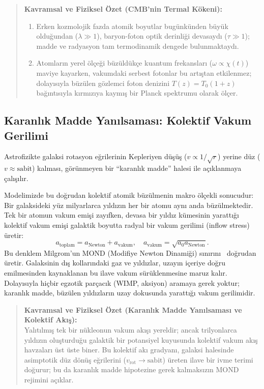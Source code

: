 \begin{quote}
    \small
    \textbf{Kavramsal ve Fiziksel Özet (CMB'nin Termal Kökeni):}
    \begin{enumerate}
        \item Erken kozmolojik fazda atomik boyutlar bugünkünden büyük olduğundan ($\lambda \gg 1$), baryon-foton optik derinliği devasaydı ($\tau \gg 1$); madde ve radyasyon tam termodinamik dengede bulunmaktaydı.
        \item Atomların yerel ölçeği büzüldükçe kuantum frekansları ($\omega \propto \chi(t)$) maviye kayarken, vakumdaki serbest fotonlar bu artıştan etkilenmez; dolayısıyla büzülen gözlemci foton denizini $T(z) = T_0 (1+z)$ bağıntısıyla kırmızıya kaymış bir Planck spektrumu olarak ölçer.
    \end{enumerate}
\end{quote}

\subsection{Karanlık Madde Yanılsaması: Kolektif Vakum Gerilimi}
Astrofizikte galaksi rotasyon eğrilerinin Kepleriyen düşüş ($v \propto 1/\sqrt{r}$) yerine düz ($v \approx \text{sabit}$) kalması, görünmeyen bir ``karanlık madde'' halesi ile açıklanmaya çalışılır.

Modelimizde bu doğrudan kolektif atomik büzülmenin makro ölçekli sonucudur:
Bir galaksideki yüz milyarlarca yıldızın her bir atomu aynı anda büzülmektedir. Tek bir atomun vakum emişi zayıfken, devasa bir yıldız kümesinin yarattığı kolektif vakum emişi galaktik boyutta radyal bir vakum gerilimi (inflow stress) üretir:
\begin{equation}
    a_{\mathrm{toplam}} = a_{\mathrm{Newton}} + a_{\mathrm{vakum}}, \quad a_{\mathrm{vakum}} = \sqrt{a_0 a_{\mathrm{Newton}}}.
    \label{eq:karanlik_madde_mond}
\end{equation}
Bu denklem Milgrom'un MOND (Modifiye Newton Dinamiği) sınırını~\cite{milgrom1983} doğrudan üretir. Galaksinin dış kollarındaki gaz ve yıldızlar, uzayın içeriye doğru emilmesinden kaynaklanan bu ilave vakum sürüklenmesine maruz kalır. Dolayısıyla hiçbir egzotik parçacık (WIMP, aksiyon) aramaya gerek yoktur; karanlık madde, büzülen yıldızların uzay dokusunda yarattığı vakum gerilimidir.

\begin{quote}
    \small
    \textbf{Kavramsal ve Fiziksel Özet (Karanlık Madde Yanılsaması ve Kolektif Akış):} \\
    Yalıtılmış tek bir nükleonun vakum akışı yereldir; ancak trilyonlarca yıldızın oluşturduğu galaktik bir potansiyel kuyusunda kolektif vakum akış havzaları üst üste biner. Bu kolektif akı gradyanı, galaksi halesinde asimptotik düz dönüş eğrilerini ($v_{\mathrm{rot}} \to \text{sabit}$) üreten ilave bir ivme terimi doğurur; bu da karanlık madde hipotezine gerek kalmaksızın MOND rejimini açıklar.
\end{quote}

